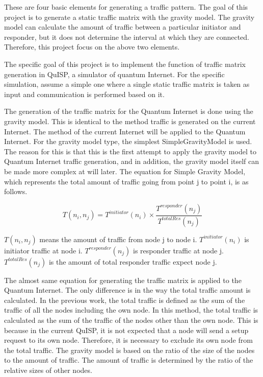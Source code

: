 These are four basic elements for generating a traffic pattern.
The goal of this project is to generate a static traffic matrix with the gravity model. 
The gravity model can calculate the amount of traffic between a particular initiator and responder, but it does not determine the interval at which they are connected.
Therefore, this project focus on the above two elements.

The specific goal of this project is to implement the function of traffic matrix generation in QuISP, a simulator of quantum Internet.
For the specific simulation, assume a simple one where a single static traffic matrix is taken as input and communication is performed based on it.

The generation of the traffic matrix for the Quantum Internet is done using the gravity model. 
This is identical to the method traffic is generated on the current Internet. 
The method of the current Internet will be applied to the Quantum Internet.
For the gravity model type, the simplest SimpleGravityModel is used.
The reason for this is that this is the first attempt to apply the gravity model to Quantum Internet traffic generation, and in addition, the gravity model itself can be made more complex at will later.
The equation for Simple Gravity Model\cite{zhang2003fast}\cite{trafficmatrix_presentation}, which represents the total amount of traffic going from point j to point i, is as follows.

\begin{screen}
    \begin{dfn}
        \begin{equation}
            T(n_i,n_j) = T^{initiator}(n_i) \times \frac{T^{responder}(n_j)}{T^{totalRes}(n_j)}
        \end{equation}
    \end{dfn}
\end{screen}

$T(n_i,n_j)$ means the amount of traffic from node j to node i. 
$T^{initiator}(n_i)$ is initiator traffic at node i.
$T^{responder}(n_j)$ is responder traffic at node j.
$T^{totalRes}(n_j)$ is the amount of total responder traffic expect node j.

The almost same equation for generating the traffic matrix is applied to the Quantum Internet.
The only difference is in the way the total traffic amount is calculated.
In the previous work, the total traffic is defined as the sum of the traffic of all the nodes including the own node.
In this method, the total traffic is calculated as the sum of the traffic of the nodes other than the own node.
This is because in the current QuISP, it is not expected that a node will send a setup request to its own node.
Therefore, it is necessary to exclude its own node from the total traffic.
The gravity model is based on the ratio of the size of the nodes to the amount of traffic. 
The amount of traffic is determined by the ratio of the relative sizes of other nodes.

